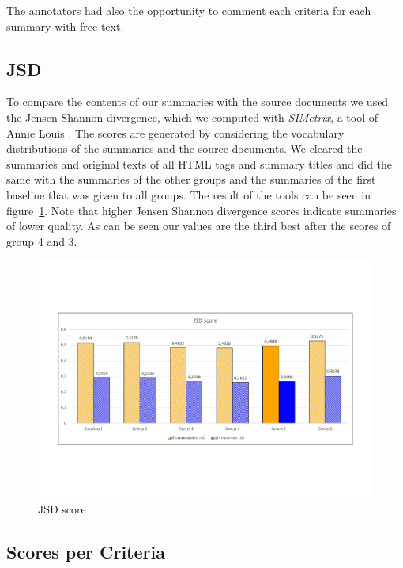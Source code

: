 The annotators had also the opportunity to comment each criteria for each summary with free text.

\subsection{JSD}
To compare the contents of our summaries with the source documents we used the
Jensen Shannon divergence, which we computed with \textit{SIMetrix}, a tool of
Annie Louis \citep{louis}. The scores are generated by considering the vocabulary
distributions of the summaries and the source documents. We cleared the summaries
and original texts of all HTML tags and summary titles and did the same
with the summaries of the other groups and the summaries of the first baseline
that was given to all groups. The result of the tools can be seen in
figure~\ref{fig:jsd}. Note that higher Jensen Shannon divergence scores indicate
summaries of lower quality. As can be seen our values are the third best after
the scores of group 4 and 3.
\begin{figure}[H]
	\centering
	\includegraphics[trim= 0 150 0 150,width=\textwidth]{img/jsd.pdf}
	\caption{JSD score}
	\label{fig:jsd}
\end{figure}


\subsection{Scores per Criteria}

